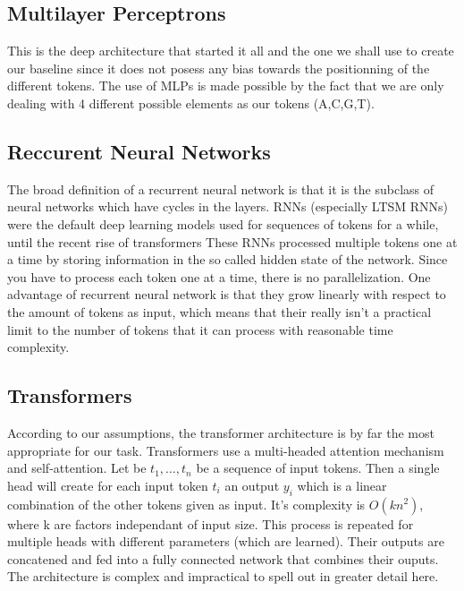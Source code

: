 \documentclass{article}
\begin{document}
\subsection*{Multilayer Perceptrons}
This is the deep architecture that started it all 
and the one we shall use to create our baseline since it does 
not posess any bias towards the positionning of 
the different tokens. The use of MLPs is made possible by the fact 
that we are only dealing with 4 different possible elements as our tokens
(A,C,G,T).

\subsection{Reccurent Neural Networks}
The broad definition of a recurrent neural network 
is that it is the subclass of neural networks \cite{lstms} which have cycles in the layers. 
RNNs (especially LTSM RNNs) were the default deep learning models used for sequences
of tokens for a while, until the recent rise of transformers 
These RNNs processed multiple tokens one at a time by storing information in the so called
hidden state of the network. Since you have to process each token one at 
a time, there is no parallelization. 
One advantage of recurrent neural network is that they grow 
linearly with respect to the amount of tokens as input, which means 
that their really isn't a practical limit to the number of tokens that
it can process with reasonable time complexity. 
\subsection{Transformers}
According to our assumptions, the transformer 
architecture \cite{transformers} is by far the most appropriate
for our task. Transformers use a multi-headed 
attention mechanism and self-attention. Let
be $t_1, \dots, t_n$ be a sequence of input tokens. Then a single 
head will create for each input token $t_i$ an output $y_i$ which is a 
linear combination of the other tokens given as input. It's complexity
is $O(kn^2)$, where k are factors independant of input size. This process is 
repeated for multiple heads with different parameters (which are learned). Their
outputs are concatened and fed into a fully connected network that combines 
their ouputs. The architecture is complex and impractical to spell out
in greater detail here.
\end{document}
